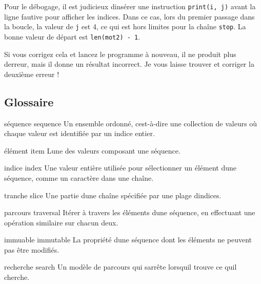 \begin{Shaded}
\begin{Highlighting}[]
\OperatorTok{\textgreater{}\textgreater{}\textgreater{}}\NormalTok{, }\NormalTok{)}
\end{Highlighting}
\end{Shaded}

Pour le débogage, il est judicieux d\textquotesingle insérer une
instruction \texttt{print(i,\ j)} avant la ligne fautive pour afficher
les indices. Dans ce cas, lors du premier passage dans la boucle, la
valeur de \texttt{j} est 4, ce qui est hors limites pour la chaîne
\texttt{\textquotesingle{}stop\textquotesingle{}}. La bonne valeur de
départ est \texttt{len(mot2)\ -\ 1}.

Si vous corrigez cela et lancez le programme à nouveau, il ne produit
plus d\textquotesingle erreur, mais il donne un résultat incorrect. Je
vous laisse trouver et corriger la deuxième erreur !

\hypertarget{glossaire}{%
\subsection{Glossaire}\label{glossaire}}

séquence sequence Un ensemble ordonné, c\textquotesingle est-à-dire une
collection de valeurs où chaque valeur est identifiée par un indice
entier.

élément item L\textquotesingle une des valeurs composant une séquence.

indice index Une valeur entière utilisée pour sélectionner un élément
d\textquotesingle une séquence, comme un caractère dans une chaîne.

tranche slice Une partie d\textquotesingle une chaîne spécifiée par une
plage d\textquotesingle indices.

parcours traversal Itérer à travers les éléments d\textquotesingle une
séquence, en effectuant une opération similaire sur chacun
d\textquotesingle eux.

immuable immutable La propriété d\textquotesingle une séquence dont les
éléments ne peuvent pas être modifiés.

recherche search Un modèle de parcours qui s\textquotesingle arrête
lorsqu\textquotesingle il trouve ce qu\textquotesingle il cherche.

